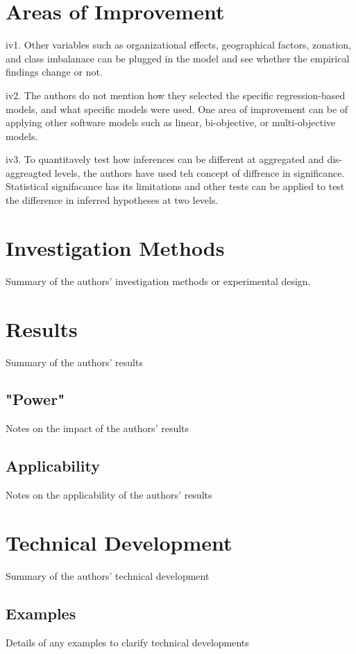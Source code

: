 \documentclass[12pt]{article}
\begin{document}
\section{Areas of Improvement}
\label{improvement}


\begin{itemize}
\begin{item}
iv1. Other variables such as organizational effects, geographical factors, zonation, and class imbalanace
can be plugged in the model and see whether the empirical findings change or not. 
\end{item}
\begin{item}
iv2. The authors do not mention how they selected the specific regression-based models, and what specific models were used. One area of improvement can be of applying other software models 
such as linear, bi-objective, or multi-objective models. 

\end{item}
\begin{item}
iv3. To quantitavely test how inferences can be different at aggregated 
and dis-aggreagted levels, the authors have used teh concept of 
diffrence in significance. Statistical signifacance has its limitations
and other tests can be applied to test the difference in inferred hypotheses
at two levels. 


\end{item}

\end{itemize} 

\section{Investigation Methods}\label{invest}
Summary of the authors' investigation methods or experimental design.

\section{Results}\label{results}
Summary of the authors' results

\subsection{"Power"}\label{results-power}
Notes on the impact of the authors' results

\subsection{Applicability}\label{results-apply}
Notes on the applicability of the authors' results

\section{Technical Development}\label{tech}
Summary of the authors' technical development

\subsection{Examples}\label{tech-examples}
Details of any examples to clarify technical developments



\end{document}
